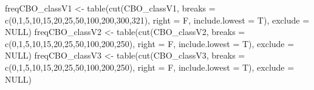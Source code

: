 \documentclass[
]{article}
\newenvironment{Shaded}{\begin{snugshade}}{\end{snugshade}}
\newcommand{\AttributeTok}[1]{\textcolor[rgb]{0.77,0.63,0.00}{#1}}
\newcommand{\ConstantTok}[1]{\textcolor[rgb]{0.00,0.00,0.00}{#1}}
\newcommand{\DecValTok}[1]{\textcolor[rgb]{0.00,0.00,0.81}{#1}}
\newcommand{\FunctionTok}[1]{\textcolor[rgb]{0.00,0.00,0.00}{#1}}
\newcommand{\NormalTok}[1]{#1}
\newcommand{\OtherTok}[1]{\textcolor[rgb]{0.56,0.35,0.01}{#1}}
\begin{document}
\begin{Shaded}
\begin{Highlighting}[]
\NormalTok{freqCBO\_classV1 }\OtherTok{\textless{}{-}} \FunctionTok{table}\NormalTok{(}\FunctionTok{cut}\NormalTok{(CBO\_classV1, }\AttributeTok{breaks =} \FunctionTok{c}\NormalTok{(}\DecValTok{0}\NormalTok{,}\DecValTok{1}\NormalTok{,}\DecValTok{5}\NormalTok{,}\DecValTok{10}\NormalTok{,}\DecValTok{15}\NormalTok{,}\DecValTok{20}\NormalTok{,}\DecValTok{25}\NormalTok{,}\DecValTok{50}\NormalTok{,}\DecValTok{100}\NormalTok{,}\DecValTok{200}\NormalTok{,}\DecValTok{300}\NormalTok{,}\DecValTok{321}\NormalTok{), }\AttributeTok{right =}\NormalTok{ F, }\AttributeTok{include.lowest =}\NormalTok{ T), }\AttributeTok{exclude =} \ConstantTok{NULL}\NormalTok{)}
\NormalTok{freqCBO\_classV2 }\OtherTok{\textless{}{-}} \FunctionTok{table}\NormalTok{(}\FunctionTok{cut}\NormalTok{(CBO\_classV2, }\AttributeTok{breaks =} \FunctionTok{c}\NormalTok{(}\DecValTok{0}\NormalTok{,}\DecValTok{1}\NormalTok{,}\DecValTok{5}\NormalTok{,}\DecValTok{10}\NormalTok{,}\DecValTok{15}\NormalTok{,}\DecValTok{20}\NormalTok{,}\DecValTok{25}\NormalTok{,}\DecValTok{50}\NormalTok{,}\DecValTok{100}\NormalTok{,}\DecValTok{200}\NormalTok{,}\DecValTok{250}\NormalTok{), }\AttributeTok{right =}\NormalTok{ F, }\AttributeTok{include.lowest =}\NormalTok{ T), }\AttributeTok{exclude =} \ConstantTok{NULL}\NormalTok{)}
\NormalTok{freqCBO\_classV3 }\OtherTok{\textless{}{-}} \FunctionTok{table}\NormalTok{(}\FunctionTok{cut}\NormalTok{(CBO\_classV3, }\AttributeTok{breaks =} \FunctionTok{c}\NormalTok{(}\DecValTok{0}\NormalTok{,}\DecValTok{1}\NormalTok{,}\DecValTok{5}\NormalTok{,}\DecValTok{10}\NormalTok{,}\DecValTok{15}\NormalTok{,}\DecValTok{20}\NormalTok{,}\DecValTok{25}\NormalTok{,}\DecValTok{50}\NormalTok{,}\DecValTok{100}\NormalTok{,}\DecValTok{200}\NormalTok{,}\DecValTok{250}\NormalTok{), }\AttributeTok{right =}\NormalTok{ F, }\AttributeTok{include.lowest =}\NormalTok{ T), }\AttributeTok{exclude =} \ConstantTok{NULL}\NormalTok{)}


\end{Highlighting}
\end{Shaded}
\end{document}
